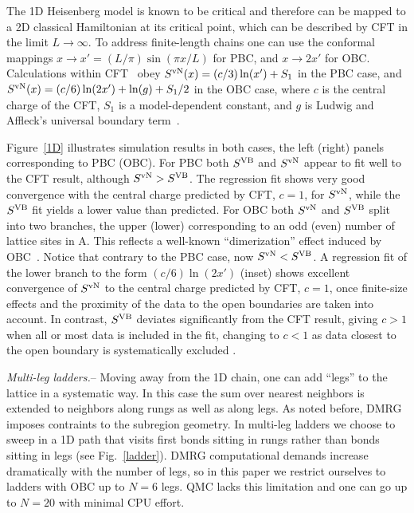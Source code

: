 \documentclass[prl,aps,twocolumn,floatfix,amsmath,amssymb,superscriptaddress,tightenlines]{revtex4}
\begin{document}
The 1D Heisenberg model is known to be critical and therefore can be
mapped to a 2D classical Hamiltonian at its critical point, which
can be described by CFT in the limit $L\to\infty$.  To address
finite-length chains one can use the conformal mappings $x\to x'=(L/\pi)
\sin(\pi x / L)$ for PBC, and 
$x\to 2x'$ for OBC. %
Calculations within CFT~\cite{Cardy} obey $S^{\rm vN}(x)= (c/3)
\ln(x') + S_1$ in the PBC case, and $S^{\rm vN}(x)= (c/6) \ln(2x') +
\ln(g)+S_1/2$ in the OBC case, where $c$ is the central charge of the CFT,
$S_1$ is a model-dependent constant, and $g$ is Ludwig and Affleck's
universal boundary term~\cite{AffleckAndLudwig}.

Figure~\ref{1D} illustrates simulation results in both cases, the left
(right) panels corresponding to PBC (OBC). 
For PBC both
$S^{\rm VB}$ and $S^{ \rm vN}$ appear to fit well to the CFT result, although
$S^{ \rm vN} > S^{\rm VB}$. The regression fit shows very good
convergence with the central charge predicted by CFT, $c=1$, for $S^{ \rm vN}$, while
the $S^{\rm VB}$ fit yields a lower value than predicted.
For OBC both $S^{ \rm vN}$ and $S^{\rm VB}$ split into two branches, the upper (lower)
corresponding to an odd (even) number of lattice sites in A.  This
reflects a well-known ``dimerization'' effect induced by OBC~\cite{Ian1}.
Notice that contrary to the PBC case, now $S^{ \rm vN} < S^{\rm VB}$. 
A regression fit of the lower branch to the form $(c/6) \ln
({2x'})$ (inset) shows excellent convergence of $S^{ \rm vN}$ to the central
charge predicted by CFT, $c=1$, once finite-size effects and the proximity
of the data to the open boundaries are taken into account.  In contrast,
 $S^{\rm VB}$ deviates significantly from the CFT result, giving 
$c>1$ when all or most data is included in the fit, changing to $c<1$
as data closest to the open boundary is systematically excluded \cite{XXX}.

{\it Multi-leg ladders.}-- Moving away from the 1D chain, one can add
``legs'' to the lattice in a systematic way. In this case the sum over
nearest neighbors is extended to neighbors along rungs as well as along
legs.  As noted before, DMRG imposes contraints to the subregion
geometry. In multi-leg ladders we choose to sweep in a 1D path that visits
first bonds sitting in rungs rather than bonds sitting in legs (see
Fig.~\ref{ladder}).  DMRG computational demands increase dramatically with
the number of legs, so in this paper we restrict ourselves to ladders with
OBC up to $N=6$ legs. QMC lacks this limitation and one can go up to
$N=20$ with minimal CPU effort.
\end{document}
